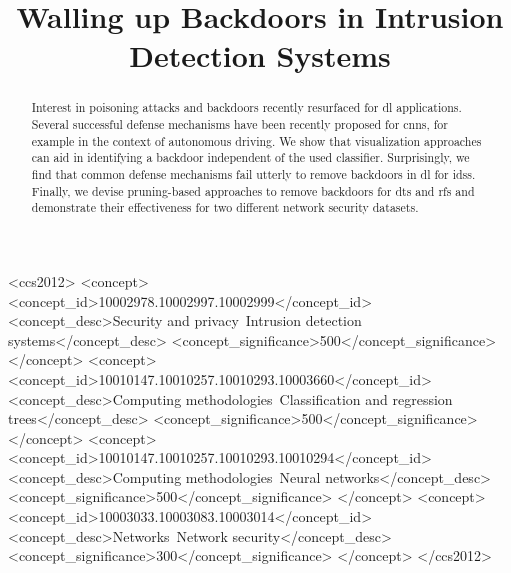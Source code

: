 \documentclass[9pt,sigconf,letterpaper,dvipsnames\ifx\removeHeaders\tempYes ,nonacm\fi]{acmart}
\begin{document}
\title{Walling up Backdoors in Intrusion Detection Systems}



\begin{abstract}
Interest in poisoning attacks and backdoors recently resurfaced for \gls{dl} applications. Several successful defense mechanisms have been recently proposed for \glspl{cnn}, for example in the context of autonomous driving. We show that visualization approaches can aid in identifying a backdoor independent of the used classifier. Surprisingly, we find that common defense mechanisms fail utterly to remove backdoors in \gls{dl} for \glspl{ids}. Finally, we devise pruning-based approaches to remove backdoors for \glspl{dt} and \glspl{rf} and demonstrate their effectiveness for two different %
network security datasets.
\end{abstract}

\ifx\removeHeaders\tempNo
\begin{CCSXML}
<ccs2012>
<concept>
<concept_id>10002978.10002997.10002999</concept_id>
<concept_desc>Security and privacy~Intrusion detection systems</concept_desc>
<concept_significance>500</concept_significance>
</concept>
<concept>
<concept_id>10010147.10010257.10010293.10003660</concept_id>
<concept_desc>Computing methodologies~Classification and regression trees</concept_desc>
<concept_significance>500</concept_significance>
</concept>
<concept>
<concept_id>10010147.10010257.10010293.10010294</concept_id>
<concept_desc>Computing methodologies~Neural networks</concept_desc>
<concept_significance>500</concept_significance>
</concept>
<concept>
<concept_id>10003033.10003083.10003014</concept_id>
<concept_desc>Networks~Network security</concept_desc>
<concept_significance>300</concept_significance>
</concept>
</ccs2012>
\end{CCSXML}
\fi
\end{document}
